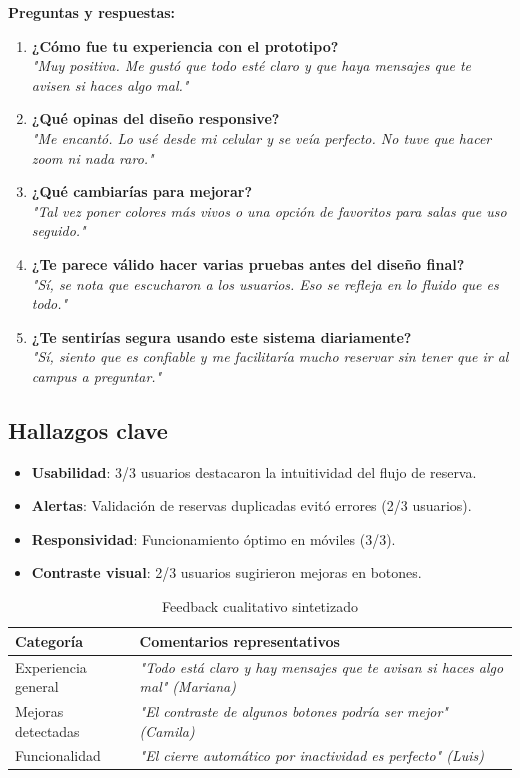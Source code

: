\documentclass{article}
\begin{document}
\textbf{Preguntas y respuestas:}
\begin{enumerate}
    \item \textbf{¿Cómo fue tu experiencia con el prototipo?} \\ 
    \textit{"Muy positiva. Me gustó que todo esté claro y que haya mensajes que te avisen si haces algo mal."}
    
    \item \textbf{¿Qué opinas del diseño responsive?} \\ 
    \textit{"Me encantó. Lo usé desde mi celular y se veía perfecto. No tuve que hacer zoom ni nada raro."}
    
    \item \textbf{¿Qué cambiarías para mejorar?} \\ 
    \textit{"Tal vez poner colores más vivos o una opción de favoritos para salas que uso seguido."}
    
    \item \textbf{¿Te parece válido hacer varias pruebas antes del diseño final?} \\ 
    \textit{"Sí, se nota que escucharon a los usuarios. Eso se refleja en lo fluido que es todo."}
    
    \item \textbf{¿Te sentirías segura usando este sistema diariamente?} \\ 
    \textit{"Sí, siento que es confiable y me facilitaría mucho reservar sin tener que ir al campus a preguntar."}
\end{enumerate}

\subsection{Hallazgos clave}
\begin{itemize}
    \item \textbf{Usabilidad}: 3/3 usuarios destacaron la intuitividad del flujo de reserva.
    \item \textbf{Alertas}: Validación de reservas duplicadas evitó errores (2/3 usuarios).
    \item \textbf{Responsividad}: Funcionamiento óptimo en móviles (3/3).
    \item \textbf{Contraste visual}: 2/3 usuarios sugirieron mejoras en botones.
\end{itemize}

\begin{table}[h]
\centering
\caption{Feedback cualitativo sintetizado}
\begin{tabular}{|p{4cm}|p{8cm}|}
\hline
\textbf{Categoría} & \textbf{Comentarios representativos} \\ \hline
Experiencia general & \textit{"Todo está claro y hay mensajes que te avisan si haces algo mal" (Mariana)} \\ \hline
Mejoras detectadas & \textit{"El contraste de algunos botones podría ser mejor" (Camila)} \\ \hline
Funcionalidad & \textit{"El cierre automático por inactividad es perfecto" (Luis)} \\ \hline
\end{tabular}
\label{tab:feedback}
\end{table}
\end{document}
